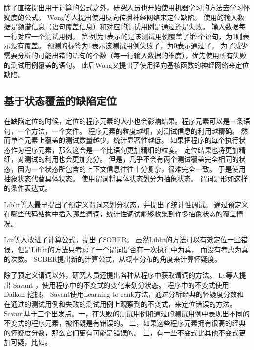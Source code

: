 除了直接提出用于计算的公式之外，研究人员也开始使用机器学习的方法去学习怀疑度的公式。
Wong等人提出使用反向传播神经网络来定位缺陷\parencite{W2009BP}。
使用的输入数据是频谱信息（语句覆盖信息）和对应的测试用例是通过还是失败。
输入数据每一行对应一个测试用例。
第i列为1表示的是该测试用例覆盖了第i个语句，为0则表示没有覆盖。
预测的标签为1表示该测试用例失败了，为0表示通过了。
为了减少需要分析的可能出错的语句的个数（每一行输入数据的维度），优先使用所有失败的测试用例覆盖的语句。
此后Wong又提出了使用径向基核函数的神经网络来定位缺陷\parencite{Wong2012Effective}。

\subsection{基于状态覆盖的缺陷定位}

在缺陷定位的时候，定位的程序元素的大小也会影响结果。程序元素可以是一条语句，一个方法，一个文件。
程序元素的粒度越细，对测试信息的利用越精确。
然而单个元素上覆盖的测试数量越少，统计显著性越低。
如果把程序的每个执行状态作为程序元素，那么这会是一个比语句更加精细的粒度。
定位结果也将更加精细，对测试的利用也会更加充分。
但是，几乎不会有两个测试覆盖完全相同的状态，因为一个状态所包含的上下文信息往往十分复杂，很难完全一致。
于是使用抽象状态代替具体状态。
使用谓词将具体状态划分为抽象状态。
谓词是形如这样的条件表达式。

Liblit等人最早提出了预定义谓词来划分状态\parencite{Liblit2005Scalable}，并提出了统计性调试。
通过预定义在哪些代码结构中插入哪些谓词，统计性调试能够收集到许多抽象状态的覆盖情况。

Liu等人改进了计算公式，提出了SOBER\parencite{Liu2006Statistical}。
虽然Liblit的方法可以有效定位一些错误，但是Liblit的方法只考虑了一个谓词是否在一次执行中为真，
而没有考虑为真的次数。
SOBER提出新的计算公式，从概率分布的角度来计算怀疑度。

除了预定义谓词以外，研究人员还提出各种从程序中获取谓词的方法。
Le等人提出 Savant\parencite{Le2016A} ，使用程序中的不变式的变化来划分状态。
程序中的不变式使用 Daikon\parencite{Ernst2007The} 挖掘。
Savant使用Learning-to-rank方法，通过分析经典的怀疑度分数和在通过的测试用例和失败的测试用例上观察到的不变式，来定位错误的方法。
Savant基于三个出发点。一，在失败的测试用例和通过的测试用例中表现出不同的不变式的程序元素，被怀疑是有错误的。
二，如果这些程序元素拥有很高的经典的怀疑度分数，那么它们更有可能是错误的。
三，有一些不变式比其他不变式更加可疑，比如。

